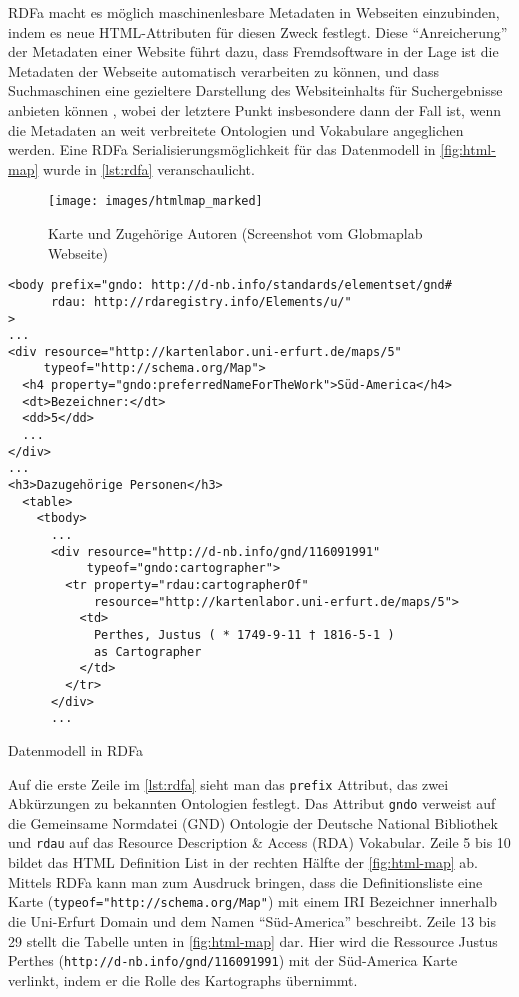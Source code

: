 RDFa macht es möglich maschinenlesbare Metadaten in Webseiten einzubinden, indem es neue HTML-Attributen für diesen Zweck festlegt. Diese \hyphenquote{german}{Anreicherung} der Metadaten einer Website führt dazu, dass Fremdsoftware in der Lage ist die Metadaten der Webseite automatisch verarbeiten zu können, und dass Suchmaschinen eine gezieltere Darstellung des Websiteinhalts für Suchergebnisse anbieten können \parencite[vgl.][Abs.~2]{Schreiber:14:RP}, wobei der letztere Punkt insbesondere dann der Fall ist, wenn die Metadaten an weit verbreitete Ontologien und Vokabulare angeglichen werden. Eine RDFa Serialisierungsmöglichkeit für das Datenmodell in \autoref{fig:html-map} wurde in \autoref{lst:rdfa} veranschaulicht.

\begin{figure}[h]
	\centering
	\texttt{[image: images/htmlmap\_marked]}
	\caption[Karte und Zugehörige Autoren]{Karte und Zugehörige Autoren (Screenshot vom Globmaplab Webseite)}
	\label{fig:html-map}
\end{figure}

\begin{listing}[H]
\begin{verbatim}
<body prefix="gndo: http://d-nb.info/standards/elementset/gnd#
      rdau: http://rdaregistry.info/Elements/u/"
>
...
<div resource="http://kartenlabor.uni-erfurt.de/maps/5"
     typeof="http://schema.org/Map">
  <h4 property="gndo:preferredNameForTheWork">Süd-America</h4>	
  <dt>Bezeichner:</dt>
  <dd>5</dd>
  ...
</div>
...
<h3>Dazugehörige Personen</h3>
  <table>
    <tbody>
      ...
      <div resource="http://d-nb.info/gnd/116091991"
           typeof="gndo:cartographer">
        <tr property="rdau:cartographerOf" 
            resource="http://kartenlabor.uni-erfurt.de/maps/5">
          <td>
            Perthes, Justus ( * 1749-9-11 † 1816-5-1 ) 
            as Cartographer
          </td>
        </tr>
      </div>
      ...
\end{verbatim}
\caption{Datenmodell in RDFa}
\label{lst:rdfa}
\end{listing}

Auf die erste Zeile im \autoref{lst:rdfa} sieht man das \texttt{prefix} Attribut, das zwei Abkürzungen zu bekannten Ontologien festlegt. Das Attribut \texttt{gndo} verweist auf die Gemeinsame Normdatei (GND) Ontologie der Deutsche National Bibliothek und \texttt{rdau} auf das Resource Description \& Access (RDA) Vokabular.  Zeile 5 bis 10 bildet das HTML Definition List in der rechten Hälfte der \autoref{fig:html-map} ab. Mittels RDFa kann man zum Ausdruck bringen, dass die Definitionsliste eine Karte (\texttt{typeof="http://schema.org/Map"}) mit einem IRI Bezeichner innerhalb die Uni-Erfurt Domain und dem Namen \hyphenquote{german}{Süd-America} beschreibt. Zeile 13 bis 29 stellt die Tabelle unten in \autoref{fig:html-map} dar. Hier wird die Ressource Justus Perthes (\texttt{http://d-nb.info/gnd/116091991}) mit der Süd-America Karte verlinkt, indem er die Rolle des Kartographs übernimmt. 
